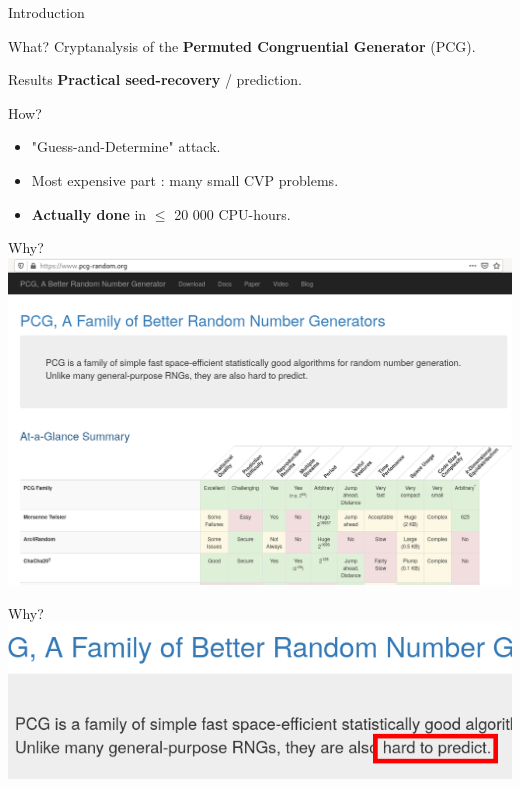 \begin{frame}[label=intro]{Introduction}
    
    \begin{exampleblock}{What?}
        Cryptanalysis of the \textbf{Permuted Congruential Generator} (PCG).
    \end{exampleblock}
    
    \medskip
    
    \begin{alertblock}{Results}
      \textbf{Practical seed-recovery} / prediction.
    \end{alertblock}
    
    \begin{block}{How?}
    \begin{itemize}
        \item "Guess-and-Determine" attack.
        \item Most expensive part : many small CVP problems.
        \item \textbf{Actually done} in $\leq$ 20 000 CPU-hours.
    \end{itemize}  
    \end{block}
\end{frame}

\begin{frame}{Why?}
    \centering
    \includegraphics[width=\textwidth]{pictures/website.png}
\end{frame}

\begin{frame}{Why?}
    \centering
    \includegraphics[width=\textwidth]{pictures/hard.png}
\end{frame}

